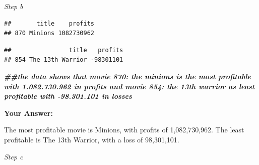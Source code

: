 \documentclass[
]{article}
\newenvironment{Shaded}{\begin{snugshade}}{\end{snugshade}}
\newcommand{\AttributeTok}[1]{\textcolor[rgb]{0.13,0.29,0.53}{#1}}
\newcommand{\DocumentationTok}[1]{\textcolor[rgb]{0.56,0.35,0.01}{\textbf{\textit{#1}}}}
\newcommand{\FunctionTok}[1]{\textcolor[rgb]{0.13,0.29,0.53}{\textbf{#1}}}
\newcommand{\NormalTok}[1]{#1}
\newcommand{\SpecialCharTok}[1]{\textcolor[rgb]{0.81,0.36,0.00}{\textbf{#1}}}
\newcommand{\StringTok}[1]{\textcolor[rgb]{0.31,0.60,0.02}{#1}}
\begin{document}
\emph{Step b}

\begin{Shaded}
\end{Shaded}

\begin{verbatim}
##       title    profits
## 870 Minions 1082730962
\end{verbatim}

\begin{Shaded}
\end{Shaded}

\begin{verbatim}
##                title   profits
## 854 The 13th Warrior -98301101
\end{verbatim}

\begin{Shaded}
\begin{Highlighting}[]
\DocumentationTok{\#\#the data shows that movie 870: the minions is the most profitable with 1.082.730.962 in profits and movie 854: the 13th warrior as least profitable with {-}98.301.101 in losses}
\end{Highlighting}
\end{Shaded}

\textbf{Your Answer:}

The most profitable movie is Minions, with profits of 1,082,730,962. The
least profitable is The 13th Warrior, with a loss of 98,301,101.

\emph{Step c}

\begin{Shaded}
\end{Shaded}
\end{document}
